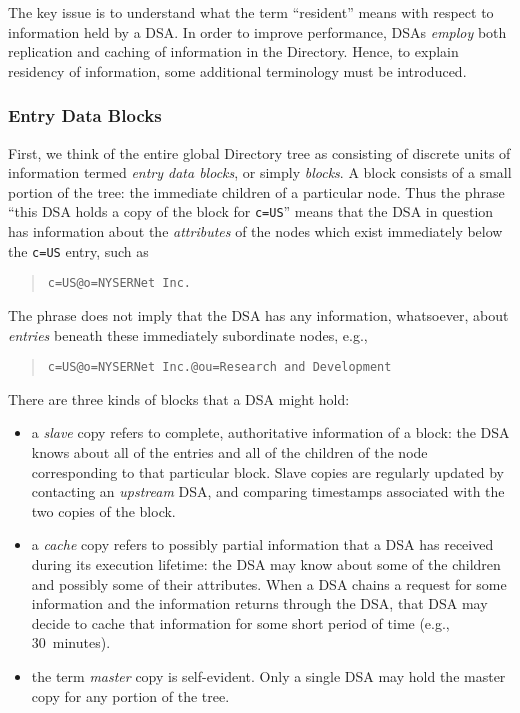 The key issue is to understand what the term ``resident'' means with respect
to information held by a DSA.
In order to improve performance,
DSAs {\em employ\/} both replication and caching of information in the
Directory.
Hence,
to explain residency of information,
some additional terminology must be introduced.

\subsubsection	{Entry Data Blocks}
First,
we think of the entire global Directory tree as consisting of discrete units
of information termed {\em entry data blocks},
or simply {\em blocks}.
A block consists of a small portion of the tree:
the immediate children of a particular node.
Thus the phrase ``this DSA holds a copy of the block for \verb"c=US"'' means
that the DSA in question has information about the {\em attributes\/} of 
the nodes which exist immediately below the \verb"c=US" entry,
such as
\begin{quote}\small\begin{verbatim}
c=US@o=NYSERNet Inc.
\end{verbatim}\end{quote}
The phrase does not imply that the DSA has any information, whatsoever,
about {\em entries\/} beneath these immediately subordinate nodes,
e.g.,
\begin{quote}\small\begin{verbatim}
c=US@o=NYSERNet Inc.@ou=Research and Development
\end{verbatim}\end{quote}
There are three kinds of blocks that a DSA might hold:
\begin{itemize}
\item	a {\em slave\/} copy refers to complete, authoritative information of
a block:
the DSA knows about all of the entries and all of the children of the node
corresponding to that particular block.
Slave copies are regularly updated by contacting an {\em upstream\/} DSA,
and comparing timestamps associated with the two copies of the block.

\item	a {\em cache\/} copy refers to possibly partial information that a DSA
has received during its execution lifetime:
the DSA may know about some of the children and possibly some of their attributes.
When a DSA chains a request for some information and the information returns
through the DSA,
that DSA may decide to cache that information for some short period of time
(e.g., 30~minutes).

\item	the term {\em master\/} copy is self-evident.
Only a single DSA may hold the master copy for any portion of the tree.
\end{itemize}

